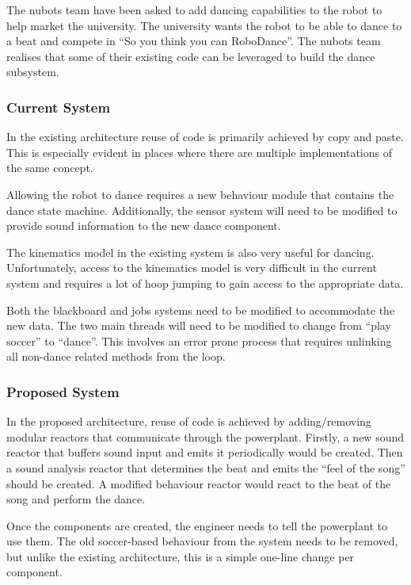 \documentclass[english,12pt]{scrartcl}
\begin{document}
			The \gls{nubots} team have been asked to add dancing capabilities to the robot to help market the university.
			The university wants the robot to be able to dance to a beat and compete in ``So you think you can RoboDance''.
			The \gls{nubots} team realises that some of their existing code can be leveraged to build the dance subsystem.

			\subsubsection{Current System}
				In the existing architecture reuse of code is primarily achieved by copy and paste.
				This is especially evident in places where there are multiple implementations of the same concept.

				Allowing the robot to dance requires a new behaviour module that contains the dance state machine.
				Additionally, the sensor system will need to be modified to provide sound information to the new dance component.

				The kinematics model in the existing system is also very useful for dancing.
				Unfortunately, access to the kinematics model is very difficult in the current system and requires a lot of hoop jumping to gain access to the appropriate data.

				Both the blackboard and jobs systems need to be modified to accommodate the new data.
				The two main threads will need to be modified to change from ``play soccer'' to ``dance''.
				This involves an error prone process that requires unlinking all non-dance related methods from the loop.

			\subsubsection{Proposed System}
				In the proposed architecture, reuse of code is achieved by adding/removing modular \glspl{reactor} that communicate through the \gls{powerplant}.
				Firstly, a new sound \gls{reactor} that buffers sound input and emits it periodically would be created.
				Then a sound analysis \gls{reactor} that determines the beat and emits the ``feel of the song'' should be created.
				A modified behaviour \gls{reactor} would react to the beat of the song and perform the dance.

				Once the components are created, the engineer needs to tell the \gls{powerplant} to use them.
				The old soccer-based behaviour from the system needs to be removed, but unlike the existing architecture, this is a simple one-line change per component.
\end{document}
